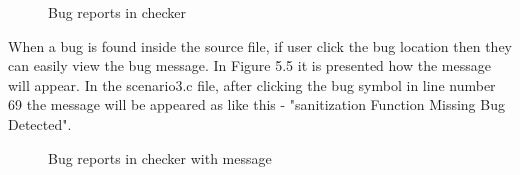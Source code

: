 \begin{figure}[htbp]
	\centering
	\label{fig:bugDetection}
	\vspace{-24em}
	\caption{Bug reports in checker}
\end{figure}

When a bug is found inside the source file, if user click the bug location then they can easily view the bug message. In Figure 5.5 it is presented how the message will appear. In the scenario3.c file,
after clicking the bug symbol in line number 69 the message will be appeared as like this - "sanitization
Function Missing Bug Detected".

\begin{figure}[htbp]
	\centering
	\label{fig:bugDetectionWithMessage}
	\caption{Bug reports in checker with message}
\end{figure}


